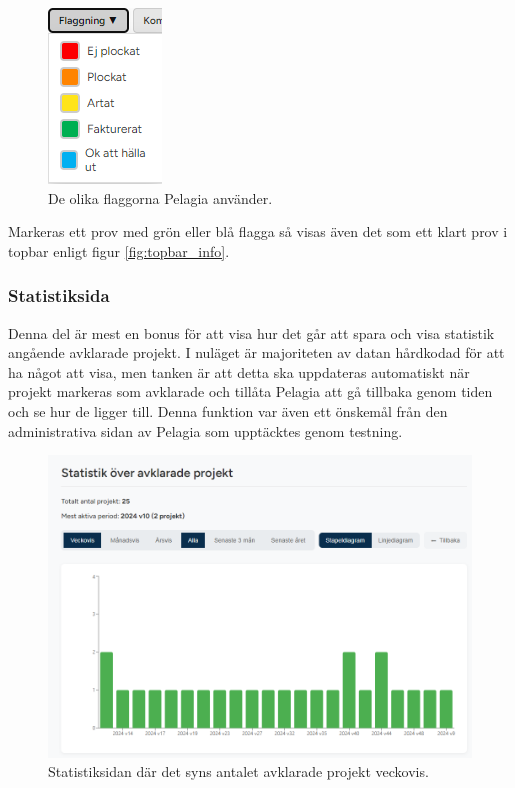 \begin{figure}[H]
    \centering
    \includegraphics[width=0.2\linewidth]{images/workspace_flaggning.png}
    \caption{De olika flaggorna Pelagia använder.}
    \label{fig:workspace_flag}
\end{figure}
\noindent Markeras ett prov med grön eller blå flagga så visas även det som ett klart prov i topbar enligt figur \ref{fig:topbar_info}.

\subsubsection{Statistiksida}
Denna del är mest en bonus för att visa hur det går att spara och visa statistik angående avklarade projekt.
I nuläget är majoriteten av datan hårdkodad för att ha något att visa, men tanken är att detta ska uppdateras automatiskt när projekt
markeras som avklarade och tillåta Pelagia att gå tillbaka genom tiden och se hur de ligger till. Denna funktion var även ett önskemål från den administrativa sidan av Pelagia som upptäcktes genom testning.  

\begin{figure}[H]
    \centering
    \includegraphics[width=1\linewidth]{images/statistik.png}
    \caption{Statistiksidan där det syns antalet avklarade projekt veckovis.}
\end{figure}
